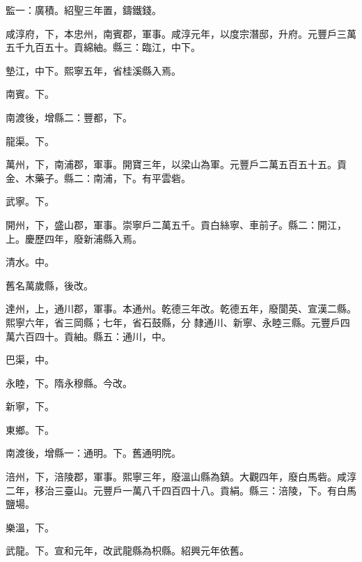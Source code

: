 \begin{pinyinscope}
 監一：廣積。紹聖三年置，鑄鐵錢。



 咸淳府，下，本忠州，南賓郡，軍事。咸淳元年，以度宗潛邸，升府。元豐戶三萬五千九百五十。貢綿紬。縣三：臨江，中下。



 墊江，中下。熙寧五年，省桂溪縣入焉。



 南賓。下。



 南渡後，增縣二：豐都，下。



 龍渠。下。



 萬州，下，南浦郡，軍事。開寶三年，以梁山為軍。元豐戶二萬五百五十五。貢金、木藥子。縣二：南浦，下。有平雲砦。



 武寧。下。



 開州，下，盛山郡，軍事。崇寧戶二萬五千。貢白絲寧、車前子。縣二：開江，上。慶歷四年，廢新浦縣入焉。



 清水。中。



 舊名萬歲縣，後改。



 達州，上，通川郡，軍事。本通州。乾德三年改。乾德五年，廢閬英、宣漢二縣。熙寧六年，省三岡縣；七年，省石鼓縣，分
 隸通川、新寧、永睦三縣。元豐戶四萬六百四十。貢紬。縣五：通川，中。



 巴渠，中。



 永睦，下。隋永穆縣。今改。



 新寧，下。



 東鄉。下。



 南渡後，增縣一：通明。下。舊通明院。



 涪州，下，涪陵郡，軍事。熙寧三年，廢溫山縣為鎮。大觀四年，廢白馬砦。咸淳二年，移治三臺山。元豐戶一萬八千四百四十八。貢絹。縣三：涪陵，下。有白馬鹽場。



 樂溫，下。



 武龍。下。宣和元年，改武龍縣為枳縣。紹興元年依舊。




\end{pinyinscope}
